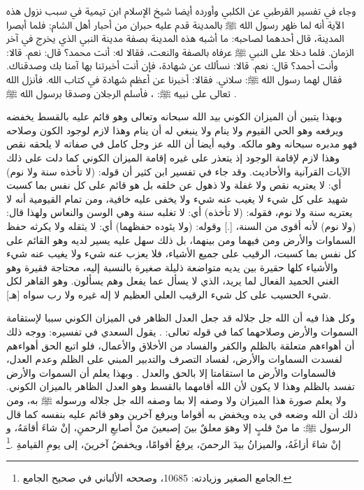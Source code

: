 وجاء في تفسير القرطبي عن الكلبي وأورده أيضا شيخ الإسلام ابن تيمية في سبب نزول هذه الآية أنه لما ظهر رسول الله ﷺ بالمدينة قدم عليه حبران من أحبار أهل الشام; فلما أبصرا المدينة، قال أحدهما لصاحبه: ما أشبه هذه المدينة بصفة مدينة النبي الذي يخرج في آخر الزمان. فلما دخلا على النبي ﷺ عرفاه بالصفة والنعت، فقالا له: أنت محمد؟ قال: نعم. قالا: وأنت أحمد؟ قال: نعم. قالا: نسألك عن شهادة، فإن أنت أخبرتنا بها آمنا بك وصدقناك. فقال لهما رسول الله ﷺ: سلاني. فقالا: أخبرنا عن أعظم شهادة في كتاب الله. فأنزل الله تعالى على نبيه ﷺ: \quranayah*[3][18]{\footnotesize \surahname*[3]}، فأسلم الرجلان وصدقا برسول الله ﷺ \href{https://shamela.ws/book/20855/1383#p4}{\faExternalLink} \cite{tafsir_Qurtubi}.

وبهذا يتبين أن الميزان الكوني بيد الله سبحانه وتعالى وهو قائم عليه بالقسط يخفضه ويرفعه وهو الحي القيوم ولا ينام ولا ينبغي له أن ينام وهذا لازم لوجود الكون وصلاحه فهو مدبره سبحانه وهو مالكه. وفيه أيضا أن الله عز وجل كامل في صفاته لا يلحقه نقص وهذا لازم لإقامة الوجود إذ يتعذر على غيره إقامة الميزان الكوني كما دلت على ذلك الآيات القرآنية والأحاديث. وقد جاء في تفسير ابن كثير أن قوله: (لا تأخذه سنة ولا نوم) أي: لا يعتريه نقص ولا غفلة ولا ذهول عن خلقه بل هو قائم على كل نفس بما كسبت شهيد على كل شيء لا يغيب عنه شيء ولا يخفى عليه خافية، ومن تمام القيومية أنه لا يعتريه سنة ولا نوم، فقوله: (لا تأخذه) أي: لا تغلبه سنة وهي الوسن والنعاس ولهذا قال: (ولا نوم) لأنه أقوى من السنة، [.] وقوله: (ولا يئوده حفظهما) أي: لا يثقله ولا يكرثه حفظ السماوات والأرض ومن فيهما ومن بينهما، بل ذلك سهل عليه يسير لديه وهو القائم على كل نفس بما كسبت، الرقيب على جميع الأشياء، فلا يعزب عنه شيء ولا يغيب عنه شيء والأشياء كلها حقيرة بين يديه متواضعة ذليلة صغيرة بالنسبة إليه، محتاجة فقيرة وهو الغني الحميد الفعال لما يريد، الذي لا يسأل عما يفعل وهم يسألون. وهو القاهر لكل شيء الحسيب على كل شيء الرقيب العلي العظيم لا إله غيره ولا رب سواه [هـ].

وكل هذا فيه أن الله جل جلاله قد جعل العدل الظاهر في الميزان الكوني سببا لإستقامة السموات والأرض وصلاحهما كما في قوله تعالى:
\quranayah*[23][71]{\footnotesize \surahname*[23]}. يقول السعدي في تفسيره:
ووجه ذلك أن أهواءهم متعلقة بالظلم والكفر والفساد من الأخلاق والأعمال، فلو اتبع الحق أهواءهم لفسدت السماوات والأرض، لفساد التصرف والتدبير المبني على الظلم وعدم العدل، فالسماوات والأرض ما استقامتا إلا بالحق والعدل \href{https://shamela.ws/book/42/1255#p12}{\faExternalLink} \cite{tafsir_Saadi}. وبهذا يعلم أن السموات والأرض تفسد بالظلم وهذا لا يكون لأن الله أقامهما بالقسط وهو العدل الظاهر بالميزان الكوني. ولا يعلم صورة هذا الميزان ولا وصفه إلا بما وصفه الله جل جلاله ورسوله ﷺ به، ومن ذلك أن الله وضعه في يده ويخفض به أقواما ويرفع آخرين وهو قائم عليه بنفسه كما قال الرسول ﷺ: ما منْ قلبٍ إلا وهوَ معلقٌ بينَ إصبعينَ منْ أصابعِ الرحمنِ، إنْ شاءَ أقامَهُ، و إنْ شاءَ أزاغَهُ، والميزانُ بيدَ الرحمنَ، يرفعُ أقوامًا، ويخفضُ آخرينَ، إلى يومِ القيامةِ \href{https://shamela.ws/book/21659/10685#p1}{\faExternalLink} \cite{jamaaSagheer}.\footnote{الجامع الصغير وزيادته: 10685، وصححه الألباني في صحيح الجامع.}

